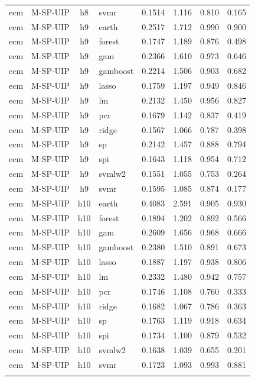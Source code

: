 \begin{ThreePartTable}
\begin{longtable}[t]{llclcccc}
ecm & M-SP-UIP & h8 & svmr & 0.1514 & 1.116 & 0.810 & 0.165\\
\addlinespace
ecm & M-SP-UIP & h9 & earth & 0.2517 & 1.712 & 0.990 & 0.900\\
ecm & M-SP-UIP & h9 & forest & 0.1747 & 1.189 & 0.876 & 0.498\\
ecm & M-SP-UIP & h9 & gam & 0.2366 & 1.610 & 0.973 & 0.646\\
ecm & M-SP-UIP & h9 & gamboost & 0.2214 & 1.506 & 0.903 & 0.682\\
ecm & M-SP-UIP & h9 & lasso & 0.1759 & 1.197 & 0.949 & 0.846\\
ecm & M-SP-UIP & h9 & lm & 0.2132 & 1.450 & 0.956 & 0.827\\
ecm & M-SP-UIP & h9 & pcr & 0.1679 & 1.142 & 0.837 & 0.419\\
ecm & M-SP-UIP & h9 & ridge & 0.1567 & 1.066 & 0.787 & 0.398\\
ecm & M-SP-UIP & h9 & sp & 0.2142 & 1.457 & 0.888 & 0.794\\
ecm & M-SP-UIP & h9 & spi & 0.1643 & 1.118 & 0.954 & 0.712\\
ecm & M-SP-UIP & h9 & svmlw2 & 0.1551 & 1.055 & 0.753 & 0.264\\
ecm & M-SP-UIP & h9 & svmr & 0.1595 & 1.085 & 0.874 & 0.177\\
\addlinespace
ecm & M-SP-UIP & h10 & earth & 0.4083 & 2.591 & 0.905 & 0.930\\
ecm & M-SP-UIP & h10 & forest & 0.1894 & 1.202 & 0.892 & 0.566\\
ecm & M-SP-UIP & h10 & gam & 0.2609 & 1.656 & 0.968 & 0.666\\
ecm & M-SP-UIP & h10 & gamboost & 0.2380 & 1.510 & 0.891 & 0.673\\
ecm & M-SP-UIP & h10 & lasso & 0.1887 & 1.197 & 0.938 & 0.806\\
ecm & M-SP-UIP & h10 & lm & 0.2332 & 1.480 & 0.942 & 0.757\\
ecm & M-SP-UIP & h10 & pcr & 0.1746 & 1.108 & 0.760 & 0.333\\
ecm & M-SP-UIP & h10 & ridge & 0.1682 & 1.067 & 0.786 & 0.363\\
ecm & M-SP-UIP & h10 & sp & 0.1763 & 1.119 & 0.918 & 0.634\\
ecm & M-SP-UIP & h10 & spi & 0.1734 & 1.100 & 0.879 & 0.532\\
ecm & M-SP-UIP & h10 & svmlw2 & 0.1638 & 1.039 & 0.655 & 0.201\\
ecm & M-SP-UIP & h10 & svmr & 0.1723 & 1.093 & 0.993 & 0.881\\
\addlinespace

\end{longtable}
\end{ThreePartTable}
